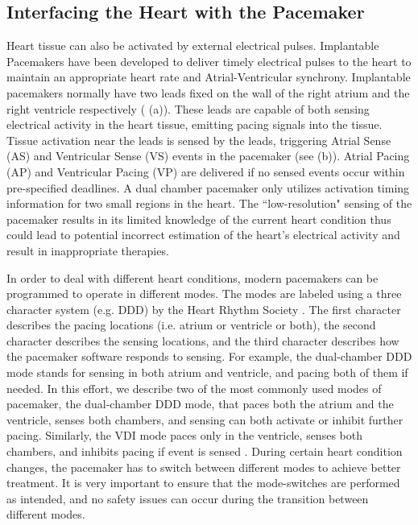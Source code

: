 \subsection{Interfacing the Heart with the Pacemaker}
Heart tissue can also be activated by external electrical pulses. %
\textsf{Implantable Pacemakers} have been developed to deliver timely electrical pulses to the heart to maintain an appropriate heart rate and Atrial-Ventricular synchrony. Implantable pacemakers normally have two leads fixed on the wall of the right atrium and the right ventricle respectively ( (a)). These leads are capable of both sensing electrical activity in the heart tissue, emitting pacing signals into the tissue. Tissue activation near the leads is sensed by the leads, triggering Atrial Sense (AS) and Ventricular Sense (VS) events in the pacemaker (see  (b)). Atrial Pacing (AP) and Ventricular Pacing (VP) are delivered if no sensed events occur within pre-specified deadlines. A dual chamber pacemaker only utilizes activation timing information for two small regions in the heart. The ``low-resolution" sensing of the pacemaker results in its limited knowledge of the current heart condition thus could lead to potential incorrect estimation of the heart's electrical activity and result in inappropriate therapies.

In order to deal with different heart conditions, modern pacemakers can be programmed to operate in different modes. The modes are labeled using a three character system (e.g. DDD) by the Heart Rhythm Society \cite{fogoros}. The first character describes the pacing locations (i.e. atrium or ventricle or both), the second character describes the sensing locations, and the third character describes how the pacemaker software responds to sensing. For example, the dual-chamber DDD mode stands for sensing in both atrium and ventricle, and pacing both of them if needed. In this effort, we describe two of the most commonly used modes of pacemaker, the dual-chamber DDD mode, that paces both the atrium and the ventricle, senses both chambers, and sensing can both activate or inhibit further pacing. Similarly, the VDI mode paces only in the ventricle, senses both chambers, and inhibits pacing if event is sensed \cite{pacemaker}. During certain heart condition changes, the pacemaker has to switch between different modes to achieve better treatment. It is very important to ensure that the mode-switches are performed as intended, and no safety issues can occur during the transition between different modes.

